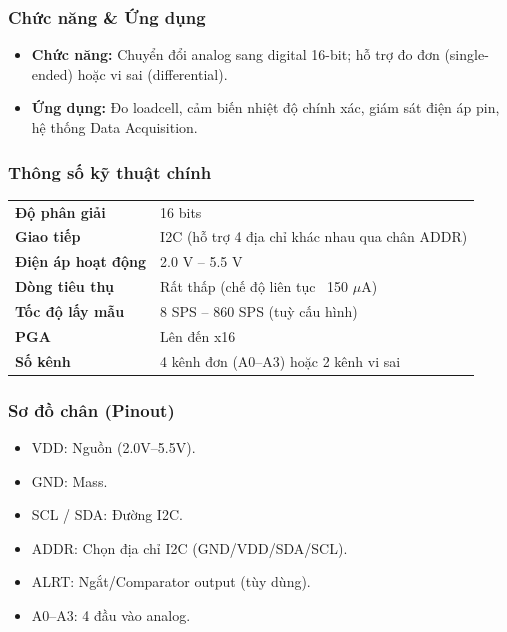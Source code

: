 \documentclass[../BTL_PTIT.tex]{subfiles}
\begin{document}
\subsubsection{Chức năng \& Ứng dụng}
\begin{itemize}[label=\textbullet]
    \item \textbf{Chức năng:} Chuyển đổi analog sang digital 16-bit; hỗ trợ đo đơn (single-ended) hoặc vi sai (differential).
    \item \textbf{Ứng dụng:} Đo loadcell, cảm biến nhiệt độ chính xác, giám sát điện áp pin, hệ thống Data Acquisition.
\end{itemize}

\subsubsection{Thông số kỹ thuật chính}
\begin{tabular}{lp{8.5cm}}
\textbf{Độ phân giải} & 16 bits \\
\textbf{Giao tiếp} & I2C (hỗ trợ 4 địa chỉ khác nhau qua chân ADDR) \\
\textbf{Điện áp hoạt động} & 2.0 V -- 5.5 V \\
\textbf{Dòng tiêu thụ} & Rất thấp (chế độ liên tục ~150 $\mu$A) \\
\textbf{Tốc độ lấy mẫu} & 8 SPS -- 860 SPS (tuỳ cấu hình) \\
\textbf{PGA} & Lên đến x16 \\
\textbf{Số kênh} & 4 kênh đơn (A0--A3) hoặc 2 kênh vi sai
\end{tabular}

\subsubsection{Sơ đồ chân (Pinout)}
\begin{itemize}[label=\textbullet]
    \item VDD: Nguồn (2.0V--5.5V).\\
    \item GND: Mass.\\
    \item SCL / SDA: Đường I2C.\\
    \item ADDR: Chọn địa chỉ I2C (GND/VDD/SDA/SCL).\\
    \item ALRT: Ngắt/Comparator output (tùy dùng).\\
    \item A0--A3: 4 đầu vào analog.
\end{itemize}
\end{document}

